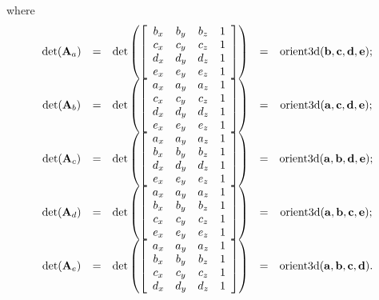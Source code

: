 where
\[
  \begin{array}{ccccc}
  \textrm{det}({\bf A}_a) &=& \textrm{det}\left(\left[\begin{array}{cccc}
              b_x & b_y & b_z & 1\\
              c_x & c_y & c_z & 1\\
              d_x & d_y & d_z & 1\\
              e_x & e_y & e_z & 1 
              \end{array}\right]\right) 
              &=& \textrm{orient3d}({\bf b}, {\bf c}, {\bf d}, {\bf e});\\ 
   \textrm{det}({\bf A}_b) &=& \textrm{det}\left(\left[\begin{array}{cccc}
               a_x & a_y & a_z & 1\\
               c_x & c_y & c_z & 1\\
               d_x & d_y & d_z & 1\\
               e_x & e_y & e_z & 1 
               \end{array}\right]\right)
              &=& \textrm{orient3d}({\bf a}, {\bf c}, {\bf d}, {\bf e});\\
    \textrm{det}({\bf A}_c) &=& \textrm{det}\left(\left[\begin{array}{cccc}
                a_x & a_y & a_z & 1\\
                b_x & b_y & b_z & 1\\
                d_x & d_y & d_z & 1\\
                e_x & e_y & e_z & 1 
                \end{array}\right]\right)
               &=& \textrm{orient3d}({\bf a}, {\bf b}, {\bf d}, {\bf e});\\ 
     \textrm{det}({\bf A}_d) &=& \textrm{det}\left(\left[\begin{array}{cccc}
                 a_x & a_y & a_z & 1\\
                 b_x & b_y & b_z & 1\\
                 c_x & c_y & c_z & 1\\
                 e_x & e_y & e_z & 1 
                 \end{array}\right]\right)
               &=& \textrm{orient3d}({\bf a}, {\bf b}, {\bf c}, {\bf e});\\
      \textrm{det}({\bf A}_e) &=& \textrm{det}\left(\left[\begin{array}{cccc}
                  a_x & a_y & a_z & 1\\
                  b_x & b_y & b_z & 1\\
                  c_x & c_y & c_z & 1\\
                  d_x & d_y & d_z & 1
                  \end{array}\right]\right)
               &=& \textrm{orient3d}({\bf a}, {\bf b}, {\bf c}, {\bf d}).
  \end{array}
\]

